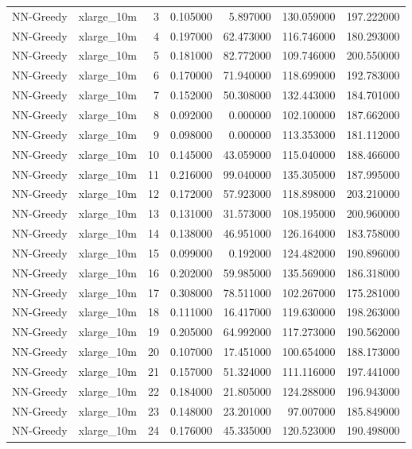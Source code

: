 \begin{tabular}{llrrrrr}
NN-Greedy & xlarge_10m & 3 & 0.105000 & 5.897000 & 130.059000 & 197.222000 \\
NN-Greedy & xlarge_10m & 4 & 0.197000 & 62.473000 & 116.746000 & 180.293000 \\
NN-Greedy & xlarge_10m & 5 & 0.181000 & 82.772000 & 109.746000 & 200.550000 \\
NN-Greedy & xlarge_10m & 6 & 0.170000 & 71.940000 & 118.699000 & 192.783000 \\
NN-Greedy & xlarge_10m & 7 & 0.152000 & 50.308000 & 132.443000 & 184.701000 \\
NN-Greedy & xlarge_10m & 8 & 0.092000 & 0.000000 & 102.100000 & 187.662000 \\
NN-Greedy & xlarge_10m & 9 & 0.098000 & 0.000000 & 113.353000 & 181.112000 \\
NN-Greedy & xlarge_10m & 10 & 0.145000 & 43.059000 & 115.040000 & 188.466000 \\
NN-Greedy & xlarge_10m & 11 & 0.216000 & 99.040000 & 135.305000 & 187.995000 \\
NN-Greedy & xlarge_10m & 12 & 0.172000 & 57.923000 & 118.898000 & 203.210000 \\
NN-Greedy & xlarge_10m & 13 & 0.131000 & 31.573000 & 108.195000 & 200.960000 \\
NN-Greedy & xlarge_10m & 14 & 0.138000 & 46.951000 & 126.164000 & 183.758000 \\
NN-Greedy & xlarge_10m & 15 & 0.099000 & 0.192000 & 124.482000 & 190.896000 \\
NN-Greedy & xlarge_10m & 16 & 0.202000 & 59.985000 & 135.569000 & 186.318000 \\
NN-Greedy & xlarge_10m & 17 & 0.308000 & 78.511000 & 102.267000 & 175.281000 \\
NN-Greedy & xlarge_10m & 18 & 0.111000 & 16.417000 & 119.630000 & 198.263000 \\
NN-Greedy & xlarge_10m & 19 & 0.205000 & 64.992000 & 117.273000 & 190.562000 \\
NN-Greedy & xlarge_10m & 20 & 0.107000 & 17.451000 & 100.654000 & 188.173000 \\
NN-Greedy & xlarge_10m & 21 & 0.157000 & 51.324000 & 111.116000 & 197.441000 \\
NN-Greedy & xlarge_10m & 22 & 0.184000 & 21.805000 & 124.288000 & 196.943000 \\
NN-Greedy & xlarge_10m & 23 & 0.148000 & 23.201000 & 97.007000 & 185.849000 \\
NN-Greedy & xlarge_10m & 24 & 0.176000 & 45.335000 & 120.523000 & 190.498000 \\

\end{tabular}
